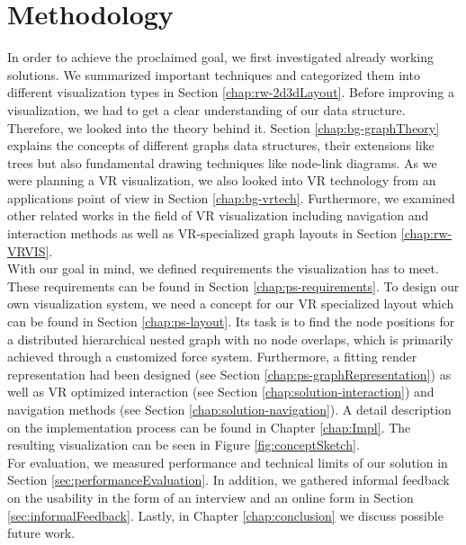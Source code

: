 \section{Methodology}
In order to achieve the proclaimed goal, we first investigated already working solutions. We summarized important techniques and categorized them into different visualization types in Section \ref{chap:rw-2d3dLayout}. 
Before improving a visualization, we had to get a clear understanding of our data structure. Therefore, we looked into the theory behind it. Section \ref{chap:bg-graphTheory} explains the concepts of different graphs data structures, their extensions like trees but also fundamental drawing techniques like node-link diagrams.
As we were planning a VR visualization, we also looked into VR technology from an applications point of view in Section \ref{chap:bg-vrtech}. Furthermore, we examined other related works in the field of VR visualization including navigation and interaction methods as well as VR-specialized graph layouts in Section \ref{chap:rw-VRVIS}.\\
With our goal in mind, we defined requirements the visualization has to meet. These requirements can be found in Section \ref{chap:ps-requirements}.
To design our own visualization system, we need a concept for our VR specialized layout which can be found in Section \ref{chap:ps-layout}. 
Its task is to find the node positions for a distributed hierarchical nested graph with no node overlaps, which is primarily achieved through a customized force system.
Furthermore, a fitting render representation had been designed (see Section \ref{chap:ps-graphRepresentation}) as well as VR optimized interaction (see Section \ref{chap:solution-interaction}) and navigation methods (see Section \ref{chap:solution-navigation}). 
A detail description on the implementation process can be found in Chapter \ref{chap:Impl}. The resulting visualization can be seen in Figure \ref{fig:conceptSketch}.\\
For evaluation, we measured performance and technical limits of our solution in Section \ref{sec:performanceEvaluation}. In addition, we gathered informal  feedback on the usability in the form of an interview and an online form in Section \ref{sec:informalFeedback}. Lastly, in Chapter \ref{chap:conclusion} we discuss possible future work.

